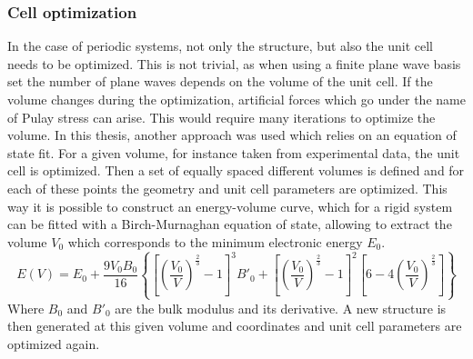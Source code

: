 \subsubsection*{Cell optimization}
In the case of periodic systems, not only the structure, but also the unit cell needs to be optimized. This is not trivial, as when using a finite plane wave basis set the number of plane waves depends on the volume of the unit cell. If the volume changes during the optimization, artificial forces which go under the name of Pulay stress can arise. This would require many iterations to optimize the volume. In this thesis, another approach was used \cite{Vanpoucke2015} which relies on an equation of state fit. For a given volume, for instance taken from experimental data, the unit cell is optimized. Then a set of equally spaced different volumes is defined and for each of these points the geometry and unit cell parameters are optimized. This way it is possible to construct an energy-volume curve, which for a rigid system can be fitted with a Birch-Murnaghan equation of state, allowing to extract the volume $V_0$ which corresponds to the minimum electronic energy $E_{0}$. 
\[
E(V) = E_{0} + 
\dfrac{9V_{0}B_{0}}{16}
\left\lbrace 
\left[\left(\dfrac{V_{0}}{V}\right)^{\frac{2}{3}} - 1\right]^{3} B'_{0} +
\left[\left(\dfrac{V_{0}}{V}\right)^{\frac{2}{3}} - 1\right]^{2}
\left[6 - 4\left(\dfrac{V_{0}}{V}\right)^{\frac{2}{3}}\right]
\right\rbrace
\]
Where $B_0$ and $B'_{0}$ are the bulk modulus and its derivative. A new structure is then generated at this given volume and coordinates and unit cell parameters are optimized again.


